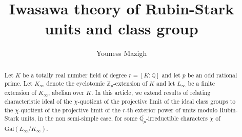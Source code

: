 \documentclass[reqno]{amsart}
\title[ Iwasawa theory of Rubin-Stark units and class group]{Iwasawa theory of Rubin-Stark units and class group}
\author[ Youness Mazigh]{Youness Mazigh}
\begin{document}
\begin{abstract}
Let $K$ be a totally real number field of degree $r=[K:\mathbb{Q}]$
and let $p$ be an odd rational prime. Let $K_{\infty}$ denote the
cyclotomic $\mathbb{Z}_{p}$-extension of $K$ and let $L_{\infty}$ be
a finite extension of $K_{\infty}$, abelian over $K$. In this
article, we extend results of \cite{Kazim109} relating
characteristic ideal of the $\chi$-quotient of the projective limit
of the ideal class groups to the $\chi$-quotient of the projective
limit of the $r$-th exterior power of units modulo Rubin-Stark
units, in the non semi-simple case, for some
$\overline{\mathbb{Q}_{p}}$-irreductible characters $\chi$ of
$\mathrm{Gal}(L_{\infty}/K_{\infty})$.
\end{abstract}
\maketitle
\end{document}
